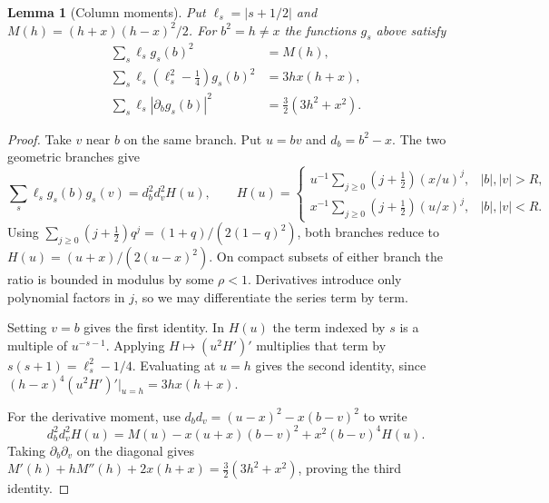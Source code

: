 \documentclass[11pt,reqno]{amsart}
\newtheorem{lemma}[theorem]{Lemma}
\begin{document}
\begin{lemma}[Column moments]\label{lem:moments}
Put \(\ell_s=|s+1/2|\) and \(M(h)=(h+x)(h-x)^2/2\). For \(b^2=h\ne x\) the functions \(g_s\) above satisfy
\[
\begin{aligned}
 \sum_s\ell_s g_s(b)^2 &= M(h),\\
 \sum_s\ell_s(\ell_s^2-\tfrac14)g_s(b)^2 &= 3hx(h+x),\\
 \sum_s\ell_s|\partial_b g_s(b)|^2 &= \tfrac32(3h^2+x^2).
\end{aligned}
\]
\end{lemma}
\begin{proof}
Take \(v\) near \(b\) on the same branch. Put \(u=bv\) and \(d_b=b^2-x\). The two geometric branches give
\[
 \sum_s\ell_s g_s(b)g_s(v)=d_b^2d_v^2 H(u),\qquad
 H(u)=
 \begin{cases}
 u^{-1}\sum_{j\ge0}(j+\tfrac12)(x/u)^j,& |b|,|v|>R,\\[2pt]
 x^{-1}\sum_{j\ge0}(j+\tfrac12)(u/x)^j,& |b|,|v|<R.
 \end{cases}
\]
Using \(\sum_{j\ge0}(j+\tfrac12)q^j=(1+q)/(2(1-q)^2)\), both branches reduce to
\(H(u)=(u+x)/(2(u-x)^2)\). On compact subsets of either branch the ratio is bounded in modulus by some \(\rho<1\). Derivatives introduce only polynomial factors in \(j\), so we may differentiate the series term by term.

Setting \(v=b\) gives the first identity. In \(H(u)\) the term indexed by \(s\) is a multiple of \(u^{-s-1}\). Applying \(H\mapsto(u^2H')'\) multiplies that term by \(s(s+1)=\ell_s^2-1/4\). Evaluating at \(u=h\) gives the second identity, since \((h-x)^4(u^2H')'|_{u=h}=3hx(h+x)\).

For the derivative moment, use \(d_b d_v=(u-x)^2-x(b-v)^2\) to write
\[
 d_b^2d_v^2H(u)=M(u)-x(u+x)(b-v)^2+x^2(b-v)^4H(u).
\]
Taking \(\partial_b\partial_v\) on the diagonal gives \(M'(h)+hM''(h)+2x(h+x)=\tfrac32(3h^2+x^2)\), proving the third identity.
\end{proof}
\end{document}
